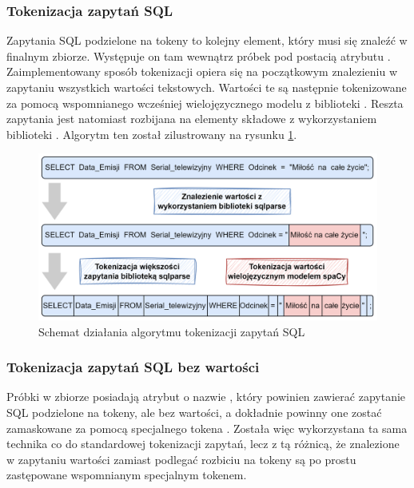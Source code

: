 \subsubsection{Tokenizacja zapytań SQL}
Zapytania SQL podzielone na tokeny to kolejny element, który musi się znaleźć w finalnym zbiorze. Występuje on tam wewnątrz próbek pod postacią atrybutu . Zaimplementowany sposób tokenizacji opiera się na początkowym znalezieniu w zapytaniu wszystkich wartości tekstowych. Wartości te są następnie tokenizowane za pomocą wspomnianego wcześniej wielojęzycznego modelu z biblioteki . Reszta zapytania jest natomiast rozbijana na elementy składowe z wykorzystaniem biblioteki . Algorytm ten został zilustrowany na rysunku \ref{fig:query-tokenization}.


\begin{figure}[ht!]
  \centering
  \includegraphics[width=1.0\linewidth]{images/query_tokenization.png}
  \caption{Schemat działania algorytmu tokenizacji zapytań SQL}
  \label{fig:query-tokenization}
\end{figure}

\subsubsection{Tokenizacja zapytań SQL bez wartości}
Próbki w zbiorze  posiadają atrybut o nazwie , który powinien zawierać zapytanie SQL podzielone na tokeny, ale bez wartości, a dokładnie powinny one zostać zamaskowane za pomocą specjalnego tokena . Została więc wykorzystana ta sama technika co do standardowej tokenizacji zapytań, lecz z tą różnicą, że znalezione w zapytaniu wartości zamiast podlegać rozbiciu na tokeny są po prostu zastępowane wspomnianym specjalnym tokenem. 


